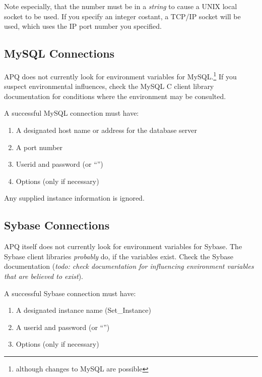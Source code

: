 \documentclass[english,letterpaper]{book}
\begin{document}
Note especially, that the number must be in a \emph{string} to cause
a UNIX local socket to be used. If you specify an integer costant,
a TCP/IP socket will be used, which uses the IP port number you specified.


\subsection{MySQL Connections}

APQ does not currently look for environment variables for MySQL.\footnote{although changes to MySQL are possible}
If you suspect environmental influences, check the MySQL C client library
documentation for conditions where the environment may be consulted.

A successful MySQL connection must have:

\begin{enumerate}
   \item A designated host name or address for the database server
   \item A port number
   \item Userid and password (or ``'')
   \item Options (only if necessary)
\end{enumerate}

Any supplied instance information is ignored.


\subsection{Sybase Connections}

APQ itself does not currently look for environment variables for Sybase.
The Sybase client libraries \emph{probably} do, if the variables exist.
Check the Sybase documentation (\emph{todo: check documentation for
influencing environment variables that are believed to exist}).

A successful Sybase connection must have:

\begin{enumerate}
   \item A designated instance name (Set\_Instance)
   \item A userid and password (or {}``'')
   \item Options (only if necessary)
\end{enumerate}
\end{document}

